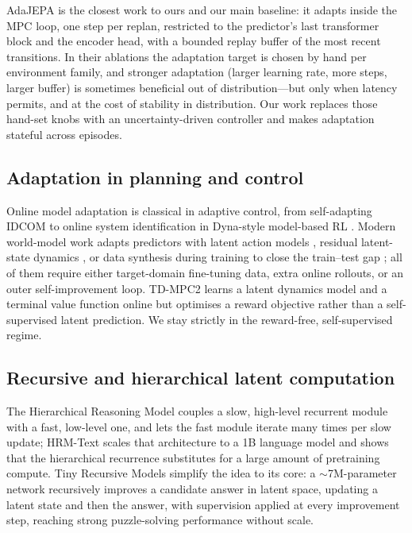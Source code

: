 AdaJEPA \cite{wang-2026-adajepa} is the closest work to ours and our main baseline: it adapts
inside the MPC loop, one step per replan, restricted to the predictor's last transformer block
and the encoder head, with a bounded replay buffer of the most recent transitions. In their
ablations the adaptation target is chosen by hand per environment family, and stronger
adaptation (larger learning rate, more steps, larger buffer) is sometimes beneficial
out of distribution---but only when latency permits, and at the cost of stability in
distribution. Our work replaces those hand-set knobs with an uncertainty-driven controller and
makes adaptation stateful across episodes.

\subsection{Adaptation in planning and control}

Online model adaptation is classical in adaptive control, from self-adapting IDCOM
\cite{foigel-1979-idcom} to online system identification in Dyna-style model-based RL
\cite{sutton-1991-dyna,thrun-1990-planning}. Modern world-model work adapts predictors with
latent action models \cite{gao-2025-adaworld}, residual latent-state dynamics
\cite{lanier-2025-residual}, or data synthesis during training to close the train--test gap
\cite{parthasarathy-2025-closing}; all of them require either target-domain fine-tuning data,
extra online rollouts, or an outer self-improvement loop. TD-MPC2 \cite{hansen-2024-tdmpc2}
learns a latent dynamics model and a terminal value function online but optimises a reward
objective rather than a self-supervised latent prediction. We stay strictly in the
reward-free, self-supervised regime.

\subsection{Recursive and hierarchical latent computation}

The Hierarchical Reasoning Model \cite{hrm-2025} couples a slow, high-level recurrent module
with a fast, low-level one, and lets the fast module iterate many times per slow update;
HRM-Text \cite{hrm-text-2026} scales that architecture to a 1B language model and shows that
the hierarchical recurrence substitutes for a large amount of pretraining compute. Tiny
Recursive Models \cite{tiny-recursive-2025} simplify the idea to its core: a
$\sim$7M-parameter network recursively improves a candidate answer in latent space, updating a
latent state and then the answer, with supervision applied at every improvement step, reaching
strong puzzle-solving performance without scale.

